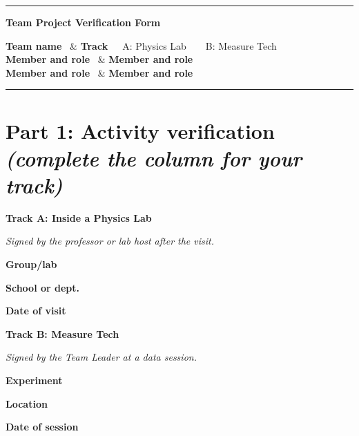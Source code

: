 \documentclass[10pt]{article}
\makeatletter
\newcommand{\field}[1]{\textbf{#1}~\hrulefill{}}
\newcommand{\cue}[1]{{\small\itshape\color{GTGray}#1}}
\newcommand{\checkbox}{\raisebox{-0.1em}{\large$\square$}~}
\newcommand{\fieldrow}[2]{\field{#1} & \field{#2}}
\newenvironment{fields}
  {\tabularx{\textwidth}{@{}X@{\hspace{2em}}X@{}}}
  {\endtabularx}
\makeatother
\begin{document}
\noindent\textcolor{GTGold}{\rule{\textwidth}{4pt}}
\vspace{-0.2em}

\begingroup
\setlength{\fboxsep}{10pt}
\noindent\colorbox{GTLightGold}{%
\parbox{\dimexpr\textwidth-2\fboxsep\relax}{%
    {\LARGE\bfseries\textcolor{GTNavy}{Team Project Verification Form}}
}}
\endgroup

\vspace{0.6em}

\begin{fields}
\field{Team name} & \textbf{Track}~~\checkbox A: Physics Lab~~~\checkbox B: Measure Tech \\[1.3em]
\fieldrow{Member and role}{Member and role} \\[1.3em]
\fieldrow{Member and role}{Member and role} \\
\end{fields}

\vspace{0.3em}

\noindent\textcolor{GTGold}{\rule{\textwidth}{1pt}}

\vspace{2.2em}
\section*{Part 1: Activity verification \cue{\normalsize(complete the column for your track)}}

\noindent
\begin{minipage}[t]{0.48\textwidth}
{\bfseries\color{GTNavy}Track A: Inside a Physics Lab}\par
\cue{Signed by the professor or lab host after the visit.}\par
\vspace{0.6em}
\field{Group/lab}\par\vspace{0.7em}
\field{School or dept.}\par\vspace{0.7em}
\field{Date of visit}\par
\end{minipage}%
\hfill
\begin{minipage}[t]{0.48\textwidth}
{\bfseries\color{GTNavy}Track B: Measure Tech}\par
\cue{Signed by the Team Leader at a data session.}\par
\vspace{0.6em}
\field{Experiment}\par\vspace{0.7em}
\field{Location}\par\vspace{0.7em}
\field{Date of session}\par
\end{minipage}
\end{document}
